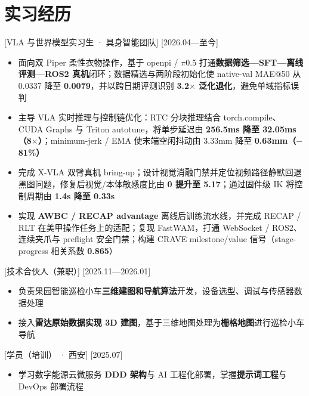 \documentclass{resume-photo}
\newcommand{\hl}[1]{\textbf{\textcolor{hlred}{#1}}}
\begin{document}
\section{实习经历}

[\textnormal{VLA 与世界模型实习生 · 具身智能团队}]
[2026.04—至今]

\begin{itemize}
  \item 面向双 Piper 柔性衣物操作，基于 openpi / $\pi$0.5 打通\hl{数据筛选—SFT—离线评测—ROS2 真机}闭环；数据精选与两阶段初始化使 native-val MAE@50 从 0.0337 降至 \hl{0.0079}，并以跨日期评测识别 \hl{3.2$\times$ 泛化退化}，避免单域指标误判
  \item 主导 VLA 实时推理与控制链优化：RTC 分块推理结合 torch.compile、CUDA Graphs 与 Triton autotune，将单步延迟由 \hl{256.5ms 降至 32.05ms（8$\times$）}；minimum-jerk / EMA 使末端空闲抖动由 3.33mm 降至 \hl{0.63mm（$-$81\%）}
  \item 完成 X-VLA 双臂真机 bring-up；设计视觉消融门禁并定位视频路径静默回退黑图问题，修复后视觉/本体敏感度比由 \hl{0 提升至 5.17}；通过固件级 IK 将控制周期由 \hl{1.4s 降至 0.33s}
  \item 实现 \hl{AWBC / RECAP advantage} 离线后训练流水线，并完成 RECAP / RLT 在美甲操作任务上的适配；复现 FastWAM，打通 WebSocket / ROS2、连续夹爪与 preflight 安全门禁；构建 CRAVE milestone/value 信号（stage-progress 相关系数 \hl{0.865}）
\end{itemize}

[\textnormal{技术合伙人（兼职）}]
[2025.11—2026.01]

\begin{itemize}
  \item 负责果园智能巡检小车\hl{三维建图和导航算法}开发，设备选型、调试与传感器数据处理
  \item 接入\hl{雷达原始数据实现 3D 建图}，基于三维地图处理为\hl{栅格地图}进行巡检小车导航
\end{itemize}

[\textnormal{学员（培训） · 西安}]
[2025.07]

\begin{itemize}
  \item 学习数字能源云微服务 \hl{DDD 架构}与 AI 工程化部署，掌握\hl{提示词工程}与 DevOps 部署流程
\end{itemize}

\end{document}
